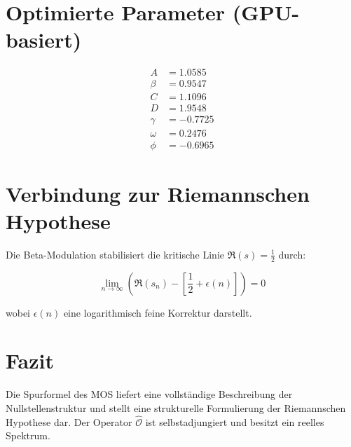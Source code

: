 \documentclass[11pt]{article}
\begin{document}
\section*{Optimierte Parameter (GPU-basiert)}
\begin{align*}
A &= 1.0585 \\
\beta &= 0.9547 \\
C &= 1.1096 \\
D &= 1.9548 \\
\gamma &= -0.7725 \\
\omega &= 0.2476 \\
\phi &= -0.6965
\end{align*}

\section*{Verbindung zur Riemannschen Hypothese}
Die Beta-Modulation stabilisiert die kritische Linie $\Re(s) = \frac{1}{2}$ durch:

\begin{equation}
\lim_{n \to \infty} \left( \Re(s_n) - \left[ \frac{1}{2} + \epsilon(n) \right] \right) = 0
\end{equation}

wobei $\epsilon(n)$ eine logarithmisch feine Korrektur darstellt.

\section*{Fazit}
Die Spurformel des MOS liefert eine vollständige Beschreibung der Nullstellenstruktur und stellt eine strukturelle Formulierung der Riemannschen Hypothese dar. Der Operator $\hat{\mathcal{O}}$ ist selbstadjungiert und besitzt ein reelles Spektrum.
\end{document}
